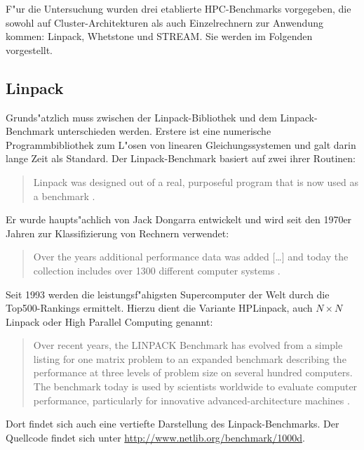 F"ur die Untersuchung wurden drei etablierte HPC-Benchmarks vorgegeben, die sowohl auf Cluster-Architekturen als auch Einzelrechnern zur Anwendung kommen: Linpack, Whetstone und STREAM. Sie werden im Folgenden vorgestellt. 

\subsection{Linpack}\label{Linpack}

Grunds"atzlich muss zwischen der Linpack-Bibliothek und dem Linpack-Benchmark unterschieden werden. Erstere ist eine numerische Programmbibliothek zum L"osen von linearen Gleichungssystemen und galt darin lange Zeit als Standard. Der Linpack-Benchmark basiert auf zwei ihrer Routinen: 
\begin{quote}
\onehalfspacing
Linpack was designed out of a real, purposeful program that is now used as a benchmark \cite{wei90}. 
\end{quote}
Er wurde haupts"achlich von Jack Dongarra entwickelt und wird seit den 1970er Jahren zur Klassifizierung von Rechnern verwendet: 
\begin{quote}
\onehalfspacing
Over the years additional performance data was added [\dots] and today the collection includes over 1300 different computer systems \cite{don03}.
\end{quote}
Seit 1993 werden die leistungsf"ahigsten Supercomputer der Welt durch die Top500-Rankings ermittelt. Hierzu dient die Variante HPLinpack, auch $N\times N$ Linpack oder High Parallel Computing genannt:  
\begin{quote}
\onehalfspacing
Over recent years, the LINPACK Benchmark has evolved from a simple listing for one matrix problem to an expanded benchmark describing the performance at three levels of problem size on several hundred computers. The benchmark today is used by scientists worldwide to evaluate computer performance, particularly for innovative advanced-architecture machines \cite{don03}. 
\end{quote}
Dort findet sich auch eine vertiefte Darstellung des Linpack-Benchmarks. Der Quellcode findet sich unter \url{http://www.netlib.org/benchmark/1000d}.

